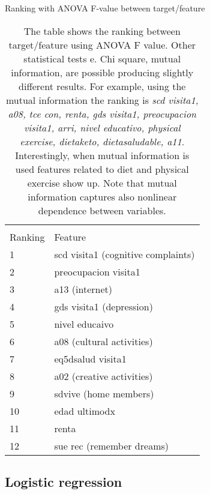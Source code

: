 \documentclass[11pt]{article}
\begin{document}
\begin{table}[H]
\caption{Ranking with ANOVA F-value between target/feature} \label{tab:ranking} 
\begin{center} 
\begin{tabular}{ll}
\hline
\multicolumn{1}{c}{} \\
Ranking & Feature     \\
\hline
1 & scd visita1 (cognitive complaints)         \\
2 & preocupacion visita1 \\
3 & a13 (internet) \\
4 & gds visita1 (depression)\\
5 & nivel educaivo \\
6 & a08 (cultural activities)\\
7 & eq5dsalud visita1 \\
8 & a02 (creative activities) \\
9 & sdvive (home members)\\
10 & edad ultimodx \\
11 & renta \\
12 & sue rec (remember dreams) \\
\hline
\end{tabular}
\caption{The table shows the ranking between target/feature using ANOVA F value. Other statistical tests e. Chi square, mutual information, are possible producing slightly different results. For example, using the mutual information the ranking is \emph{scd visita1, a08, tce con, renta, gds visita1, preocupacion visita1, arri, nivel educativo, physical exercise, dietaketo, dietasaludable, a11}. Interestingly, when mutual information is used features related to diet and physical exercise show up. Note that mutual information captures also nonlinear dependence between variables.}
\end{center}
\end{table}



\subsection{Logistic regression}
\label{se:reslogreg}
\end{document}
